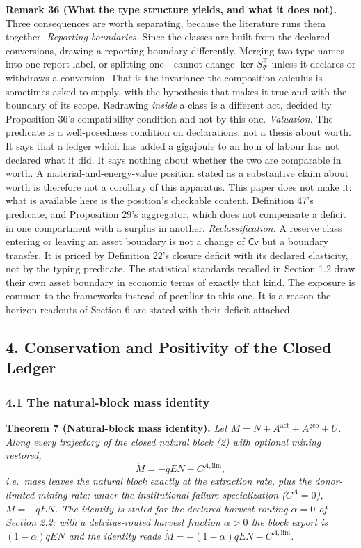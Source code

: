\documentclass[11pt]{article}
\begin{document}
\textbf{Remark 36 (What the type structure yields, and what it does not).} Three consequences are worth separating, because the literature runs them together. \emph{Reporting boundaries.} Since the classes are built from the declared conversions, drawing a reporting boundary differently. Merging two type names into one report label, or splitting one---cannot change \(\ker S_{\mathcal{T}}^{\top}\) unless it declares or withdraws a conversion. That is the invariance the composition calculus is sometimes asked to supply, with the hypothesis that makes it true and with the boundary of its scope. Redrawing \emph{inside} a class is a different act, decided by Proposition 36's compatibility condition and not by this one. \emph{Valuation.} The predicate is a well-posedness condition on declarations, not a thesis about worth. It says that a ledger which has added a gigajoule to an hour of labour has not declared what it did. It says nothing about whether the two are comparable in worth. A material-and-energy-value position stated as a substantive claim about worth is therefore not a corollary of this apparatus. This paper does not make it: what is available here is the position's checkable content. Definition 47's predicate, and Proposition 29's aggregator, which does not compensate a deficit in one compartment with a surplus in another. \emph{Reclassification.} A reserve class entering or leaving an asset boundary is not a change of \(\mathsf{Cv}\) but a boundary transfer. It is priced by Definition 22's closure deficit with its declared elasticity, not by the typing predicate. The statistical standards recalled in Section 1.2 draw their own asset boundary in economic terms of exactly that kind. The exposure is common to the frameworks instead of peculiar to this one. It is a reason the horizon readouts of Section 6 are stated with their deficit attached.



\subsection{4. Conservation and Positivity of the Closed
Ledger}\label{conservation-and-positivity-of-the-closed-ledger}

\subsubsection{4.1 The natural-block mass
identity}\label{the-natural-block-mass-identity}

\textbf{Theorem 7 (Natural-block mass identity).} \emph{Let
\(M = N + A^{\mathrm{act}} + A^{\mathrm{geo}} + U\). Along every
trajectory of the closed natural block (2) with optional mining
restored,} \[\dot M = -qEN - C^{A,\mathrm{lim}},\] \emph{i.e.~mass
leaves the natural block exactly at the extraction rate, plus the
donor-limited mining rate; under the institutional-failure
specialization (\(C^A = 0\)), \(\dot M = -qEN\). The identity is stated
for the declared harvest routing \(\alpha = 0\) of Section 2.2; with a
detritus-routed harvest fraction \(\alpha > 0\) the block export is
\((1-\alpha)qEN\) and the identity reads
\(\dot M = -(1-\alpha)qEN - C^{A,\mathrm{lim}}\).}
\end{document}
